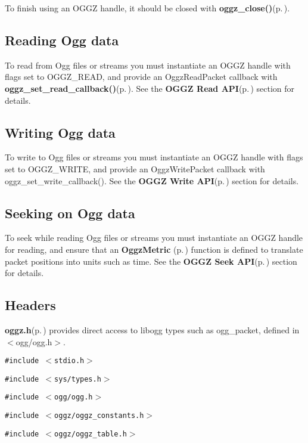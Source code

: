 To finish using an OGGZ handle, it should be closed with {\bf oggz\_\-close()}{\rm (p.\,\pageref{oggz_8h_a8})}.\subsection{Reading Ogg data}\label{reading}
To read from Ogg files or streams you must instantiate an OGGZ handle with flags set to OGGZ\_\-READ, and provide an Oggz\-Read\-Packet callback with {\bf oggz\_\-set\_\-read\_\-callback()}{\rm (p.\,\pageref{group__read__api_a1})}. See the {\bf OGGZ Read API}{\rm (p.\,\pageref{group__read__api})} section for details.\subsection{Writing Ogg data}\label{writing}
To write to Ogg files or streams you must instantiate an OGGZ handle with flags set to OGGZ\_\-WRITE, and provide an Oggz\-Write\-Packet callback with oggz\_\-set\_\-write\_\-callback(). See the {\bf OGGZ Write API}{\rm (p.\,\pageref{group__write__api})} section for details.\subsection{Seeking on Ogg data}\label{seeking}
To seek while reading Ogg files or streams you must instantiate an OGGZ handle for reading, and ensure that an {\bf Oggz\-Metric }{\rm (p.\,\pageref{group__metric})} function is defined to translate packet positions into units such as time. See the {\bf OGGZ Seek API}{\rm (p.\,\pageref{group__seek__api})} section for details.\subsection{Headers}\label{headers}
{\bf oggz.h}{\rm (p.\,\pageref{oggz_8h})} provides direct access to libogg types such as ogg\_\-packet, defined in $<$ogg/ogg.h$>$.

{\tt \#include $<$stdio.h$>$}\par
{\tt \#include $<$sys/types.h$>$}\par
{\tt \#include $<$ogg/ogg.h$>$}\par
{\tt \#include $<$oggz/oggz\_\-constants.h$>$}\par
{\tt \#include $<$oggz/oggz\_\-table.h$>$}\par
